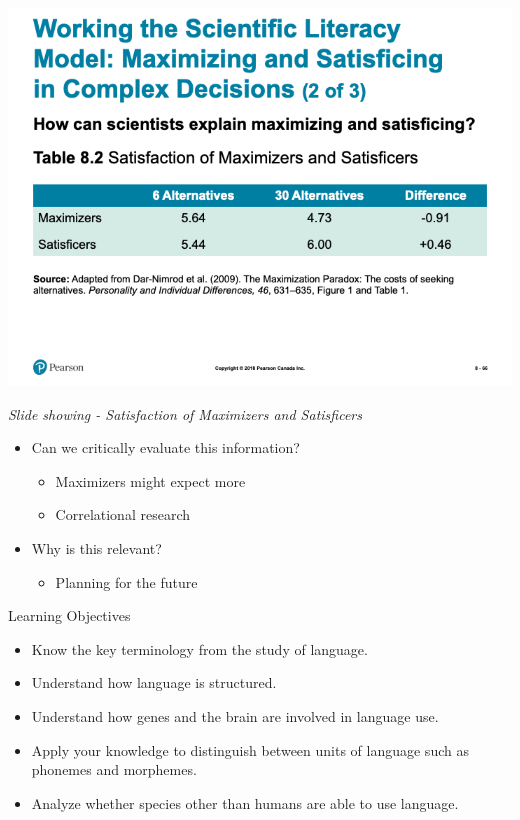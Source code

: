 \documentclass[
]{book}
\providecommand{\tightlist}{%
  \setlength{\itemsep}{0pt}\setlength{\parskip}{0pt}}
\begin{document}
\includegraphics{assets/unit_1/slide_66.png}

\emph{Slide showing - Satisfaction of Maximizers and Satisficers}

\begin{itemize}
\tightlist
\item
  Can we critically evaluate this information?

  \begin{itemize}
  \tightlist
  \item
    Maximizers might expect more\\
  \item
    Correlational research\\
  \end{itemize}
\item
  Why is this relevant?

  \begin{itemize}
  \tightlist
  \item
    Planning for the future
  \end{itemize}
\end{itemize}

Learning Objectives

\begin{itemize}
\tightlist
\item
  Know the key terminology from the study of language.\\
\item
  Understand how language is structured.\\
\item
  Understand how genes and the brain are involved in language use.\\
\item
  Apply your knowledge to distinguish between units of language such as phonemes and morphemes.\\
\item
  Analyze whether species other than humans are able to use language.
\end{itemize}
\end{document}
